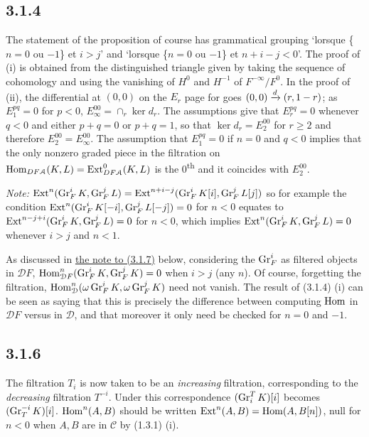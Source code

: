 \documentclass[deligne.tex]{subfiles}
\begin{document}
\subsection*{3.1.4} The statement of the proposition of course has grammatical grouping
`lorsque \{$n=0$ ou $-1$\} et $i>j$' and `lorsque \{$n=0$ ou $-1$\} et 
$n+i-j<0$'. The proof of (i) is obtained from the distinguished triangle
given by taking the sequence of cohomology and using the vanishing of $H^0$
and $H^{-1}$ of $F^{-\infty}/F^0$. In the proof of (ii), the differential
at $(0,0)$ on the $E_r$ page for goes $(0,0)\xrightarrow{d}(r,1-r)$;
as $E_1^{pq}=0$ for $p<0$, $E_\infty^{00}=\cap_r\ker d_r$.
The assumptions give that $E_r^{pq}=0$ whenever $q<0$ and either $p+q=0$ or
$p+q=1$, so that $\ker d_r=E_2^{00}$ for $r\geq2$ and therefore
$E_2^{00}=E_\infty^{00}$. The assumption that $E_1^{pq}=0$ if $n=0$ and
$q<0$ implies that the only nonzero graded piece in the filtration on
$\operatorname{Hom}_{DF\mathcal A}(K,L)=\operatorname{Ext}^0_{DF\mathcal A}(K,L)$ is the 
0\textsuperscript{th} and it coincides with $E_2^{00}$.

\emph{Note:}
$\operatorname{Ext}^n(\operatorname{Gr}_F^iK,\operatorname{Gr}_F^jL)=\operatorname{Ext}^{n+i-j}(\operatorname{Gr}_F^iK[i],\operatorname{Gr}_F^jL[j])$ so
for example the condition $\operatorname{Ext}^{n}(\operatorname{Gr}_F^iK[-i],\operatorname{Gr}_F^jL[-j])=0$ for
$n<0$ equates to $\operatorname{Ext}^{n-j+i}(\operatorname{Gr}_F^iK,\operatorname{Gr}_F^jL)=0$ for $n<0$, which
implies $\operatorname{Ext}^n(\operatorname{Gr}_F^iK,\operatorname{Gr}_F^jL)=0$ whenever $i>j$ and $n<1$.

\begin{remark}[vague]
	As discussed in \hyperref[BBD:3.1.7]{the note to (3.1.7)} below,
	considering the $\operatorname{Gr}_F^i$ as filtered objects in $\mathcal DF$,
	$\operatorname{Hom}^n_{\mathcal DF}(\operatorname{Gr}_F^iK,\operatorname{Gr}_F^jK)=0$ when $i>j$ (any $n$).
	Of course, forgetting the filtration,
	$\operatorname{Hom}^n_{\mathcal D}(\omega\operatorname{Gr}_F^iK,\omega\operatorname{Gr}_F^jK)$ need not vanish.
	The result of (3.1.4) (i) can be seen as saying that this is precisely
	the difference between computing $\operatorname{Hom}$ in $\mathcal DF$ versus in 
	$\mathcal D$, and that moreover it only need be checked for $n=0$ and 
	$-1$.
\end{remark}


\subsection*{3.1.6} The filtration $T_i$ is now taken to be an \emph{increasing} 
filtration, corresponding to the \emph{decreasing} filtration $T^{-i}$.
Under this correspondence $(\operatorname{Gr}_i^TK)[i]$ becomes $(\operatorname{Gr}_T^{-i}K)[i]$.
$\operatorname{Hom}^n(A,B)$ should be written $\operatorname{Ext}^n(A,B)=\operatorname{Hom}(A,B[n])$, null for $n<0$
when $A,B$ are in $\mathcal C$ by (1.3.1) (i).
\end{document}
